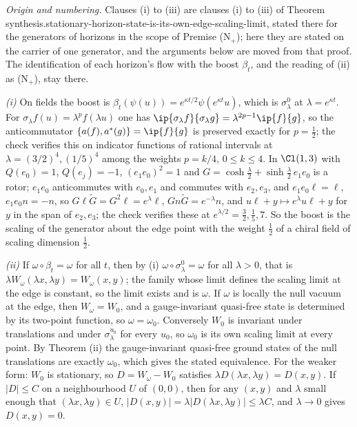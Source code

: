 \emph{Origin and numbering.} Clauses (i) to (iii) are clauses (i) to (iii) of Theorem synthesis.stationary-horizon-state-is-its-own-edge-scaling-limit, stated there for the generators of horizons in the scope of Premise (N$_{+}$); here they are stated on the carrier of one generator, and the arguments below are moved from that proof. The identification of each horizon's flow with the boost $\beta_{t}$, and the reading of (ii) as (N$_{+}$), stay there.

\emph{(i)} On fields the boost is $\beta_{t}(\psi(u)) = e^{\kappa t/2}\psi(e^{\kappa t}u)$, which is $\sigma^{0}_{\lambda}$ at $\lambda = e^{\kappa t}$. For $\sigma_{\lambda}f(u) = \lambda^{p}f(\lambda u)$ one has $\ip{\sigma_{\lambda}f}{\sigma_{\lambda}g} = \lambda^{2p - 1}\ip{f}{g}$, so the anticommutator $\{a(f), a^{*}(g)\} = \ip{f}{g}$ is preserved exactly for $p = \tfrac12$; the check verifies this on indicator functions of rational intervals at $\lambda = (3/2)^{4}, (1/5)^{4}$ among the weights $p = k/4$, $0 \le k \le 4$. In $\Cl(1,3)$ with $Q(e_{0}) = 1$, $Q(e_{j}) = -1$, $(e_{1}e_{0})^{2} = 1$ and $G = \cosh\tfrac{\lambda}{2} + \sinh\tfrac{\lambda}{2}\,e_{1}e_{0}$ is a rotor; $e_{1}e_{0}$ anticommutes with $e_{0}, e_{1}$ and commutes with $e_{2}, e_{3}$, and $e_{1}e_{0}\ell = \ell$, $e_{1}e_{0}n = -n$, so $G\ell\tilde G = G^{2}\ell = e^{\lambda}\ell$, $Gn\tilde G = e^{-\lambda}n$, and $u\ell + y \mapsto e^{\lambda}u\ell + y$ for $y$ in the span of $e_{2}, e_{3}$; the check verifies these at $e^{\lambda/2} = \tfrac32, \tfrac15, 7$. So the boost is the scaling of the generator about the edge point with the weight $\tfrac12$ of a chiral field of scaling dimension $\tfrac12$.

\emph{(ii)} If $\omega\circ\beta_{t} = \omega$ for all $t$, then by (i) $\omega\circ\sigma^{0}_{\lambda} = \omega$ for all $\lambda > 0$, that is $\lambda W_{\omega}(\lambda x, \lambda y) = W_{\omega}(x, y)$; the family whose limit defines the scaling limit at the edge is constant, so the limit exists and is $\omega$. If $\omega$ is locally the null vacuum at the edge, then $W_{\omega} = W_{0}$, and a gauge-invariant quasi-free state is determined by its two-point function, so $\omega = \omega_{0}$. Conversely $W_{0}$ is invariant under translations and under $\sigma^{u_{0}}_{\lambda}$ for every $u_{0}$, so $\omega_{0}$ is its own scaling limit at every point. By Theorem (ii) the gauge-invariant quasi-free ground states of the null translations are exactly $\omega_{0}$, which gives the stated equivalence. For the weaker form: $W_{0}$ is stationary, so $D = W_{\omega} - W_{0}$ satisfies $\lambda D(\lambda x, \lambda y) = D(x, y)$. If $|D| \le C$ on a neighbourhood $U$ of $(0, 0)$, then for any $(x, y)$ and $\lambda$ small enough that $(\lambda x, \lambda y) \in U$, $|D(x, y)| = \lambda|D(\lambda x, \lambda y)| \le \lambda C$, and $\lambda \to 0$ gives $D(x, y) = 0$.

